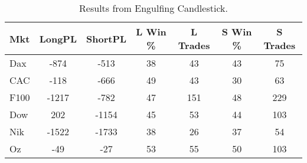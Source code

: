 \begin{table}[ht]
\centering
\caption[Engulfing Candlestick System]{Results from Engulfing Candlestick.} 
\label{tab:engulf_aroon_results}
\begin{tabular}{lcccccc}
  \toprule Mkt & LongPL & ShortPL & L Win \% & L Trades & S Win \% & S Trades \\ 
  \midrule Dax & -874 & -513 & 38 & 43 & 43 & 75 \\ 
  CAC & -118 & -666 & 49 & 43 & 30 & 63 \\ 
  F100 & -1217 & -782 & 47 & 151 & 48 & 229 \\ 
  Dow & 202 & -1154 & 45 & 53 & 44 & 103 \\ 
  Nik & -1522 & -1733 & 38 & 26 & 37 & 54 \\ 
  Oz & -49 & -27 & 53 & 55 & 50 & 103 \\ 
   \bottomrule \end{tabular}
\end{table}
